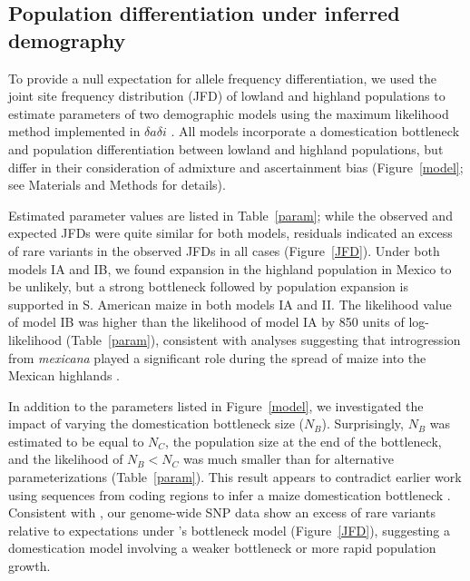 \subsection*{Population differentiation under inferred demography}

To provide a null expectation for allele frequency differentiation, we used the joint site frequency distribution (JFD) of lowland and highland populations to estimate parameters of two demographic models  using the maximum likelihood method implemented in $\delta a \delta i$ \cite[]{Gutenkunst_2009_19851460}.  
All models incorporate a domestication bottleneck \cite[]{Wright_2005_15919994} and population differentiation between lowland and highland populations, but differ in their consideration of admixture and ascertainment bias (Figure~\ref{model}; see Materials and Methods for details).

Estimated parameter values are listed in Table~\ref{param}; while the observed and expected JFDs were quite similar for both models,  residuals indicated an excess of rare variants in the observed JFDs in all cases (Figure~\ref{JFD}). 
Under both models IA and IB,  we found expansion in the highland population in Mexico to be unlikely, but a strong bottleneck followed by population expansion is supported in S. American maize in both models IA and II.  
The likelihood value of model IB was higher than the likelihood of model IA by 850 units of log-likelihood (Table~\ref{param}), consistent with analyses suggesting that introgression from \textit{mexicana} played a significant role during the spread of maize into the Mexican highlands \cite{Profford_2013}. 

In addition to the parameters listed in Figure~\ref{model}, we investigated the impact of varying the domestication bottleneck size ($N_B$).  
Surprisingly, $N_B$ was estimated to be equal to $N_C$, the population size at the end of the bottleneck, and the likelihood of $N_B<N_C$ was much smaller than for alternative parameterizations (Table~\ref{param}). This result appears to contradict earlier work using sequences from coding regions to infer a maize domestication bottleneck \cite[]{Eyre-Walker_1998_9539756,Tenaillon_2004_15014173,Wright_2005_15919994}.  
Consistent with \citet{Hufford_2012_22660546}, our genome-wide SNP data show an excess of rare variants relative to expectations under \cite{Wright_2005_15919994}'s bottleneck model (Figure~\ref{JFD}), suggesting a domestication model involving a weaker bottleneck or more rapid population growth.

